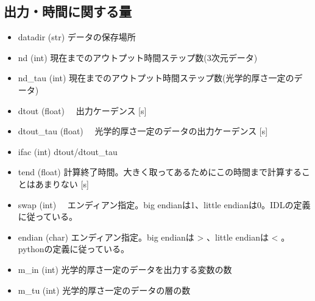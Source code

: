 \documentclass[letterpaper,10pt,dvipdfmx,report]{sphinxmanual}
\begin{document}
\subsection{出力・時間に関する量}
\label{\detokenize{notation:id1}}\begin{itemize}
\item {} 
datadir (str) \sphinxhyphen{}\sphinxhyphen{} データの保存場所

\item {} 
nd (int) \sphinxhyphen{}\sphinxhyphen{} 現在までのアウトプット時間ステップ数(3次元データ)

\item {} 
nd\_tau (int) \sphinxhyphen{}\sphinxhyphen{} 現在までのアウトプット時間ステップ数(光学的厚さ一定のデータ)

\item {} 
dtout (float) \sphinxhyphen{}\sphinxhyphen{}　出力ケーデンス {[}s{]}

\item {} 
dtout\_tau (float) \sphinxhyphen{}\sphinxhyphen{}　光学的厚さ一定のデータの出力ケーデンス {[}s{]}

\item {} 
ifac (int) \sphinxhyphen{}\sphinxhyphen{} dtout/dtout\_tau

\item {} 
tend (float) \sphinxhyphen{}\sphinxhyphen{} 計算終了時間。大きく取ってあるためにこの時間まで計算することはあまりない {[}s{]}

\item {} 
swap (int) \sphinxhyphen{}\sphinxhyphen{}　エンディアン指定。big endianは1、little endianは0。IDLの定義に従っている。

\item {} 
endian (char) \sphinxhyphen{}\sphinxhyphen{} エンディアン指定。big endianは \textgreater{} 、little endianは \textless{} 。pythonの定義に従っている。

\item {} 
m\_in (int) \sphinxhyphen{}\sphinxhyphen{} 光学的厚さ一定のデータを出力する変数の数

\item {} 
m\_tu (int) \sphinxhyphen{}\sphinxhyphen{} 光学的厚さ一定のデータの層の数

\end{itemize}
\end{document}
